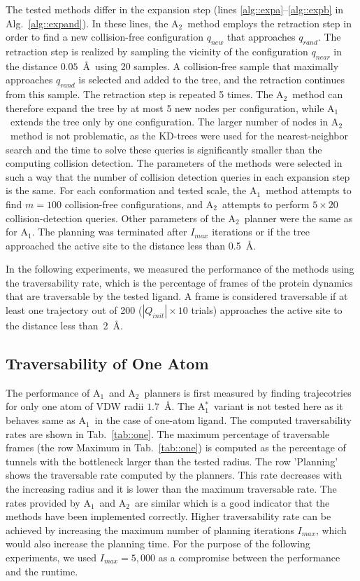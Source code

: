 \documentclass[usletter, 10pt, conference]{ieeeconf} %
\def\qrand{q_{rand}}
\def\qnear{q_{near}}
\def\qnew{q_{new}}
\def\QI{Q_{init}}
\def\Imax{I_{max}} %
\def\RA{A$_{1}$}
\def\RB{A$_{2}$}
\def\RC{A$_{1}^{*}$}
\begin{document}
{The tested methods differ in the expansion step (lines \ref{alg::expa}--\ref{alg::expb} in Alg.~\ref{alg::expand}).
In these lines, the \RB\ method employs the retraction step in order to find a new collision-free configuration $\qnew$ that approaches $\qrand$.
The retraction step is realized by sampling the vicinity of the configuration $\qnear$ in the distance $0.05$~\AA\ using 20 samples.
A collision-free sample that maximally approaches $\qrand$ is selected and added to the tree, and the retraction continues from this sample.
The retraction step is repeated 5 times.
The \RB\ method can therefore expand the tree by at most 5 new nodes per configuration, while \RA\ extends the tree only by one configuration.
The larger number of nodes in \RB\ method is not problematic, as the KD-trees were used for the nearest-neighbor search and the time to solve these queries is significantly smaller than the computing collision detection.
The parameters of the methods were selected in such a way that the number of collision detection queries in each expansion step is the same.
For each conformation and tested scale, the \RA\ method attempts to find $m=100$ collision-free configurations, and \RB\ attempts to perform $5 \times 20$ collision-detection queries.
Other parameters of the \RB\ planner were the same as for \RA.
The planning was terminated after $\Imax$ iterations or if the tree approached the active site to the distance less than 0.5~\AA.

In the following experiments, we measured the performance of the methods using the traversability rate, which is the percentage of frames of the protein dynamics that are traversable by the tested ligand.
A frame is considered traversable if at least one trajectory out of 200 ($\!|\QI|\!\times\!\!10$ trials) approaches the active site to the distance less than~2~\AA. 


\subsection{Traversability of One Atom}

The performance of \RA\ and \RB\ planners is first measured by finding trajecotries for only one atom of VDW radii $1.7$~\AA.
The \RC\ variant is not tested here as it behaves same as \RA\ in the case of one-atom ligand.
The computed traversability rates are shown in Tab.~\ref{tab::one}.
The maximum percentage of traversable frames (the row Maximum in Tab.~\ref{tab::one}) is computed as the percentage of tunnels with the bottleneck larger than the tested radius.
The row 'Planning' shows the traversable rate computed by the planners.
This rate decreases with the increasing radius and it is lower than the maximum traversable rate.
The rates provided by \RA\ and \RB\ are similar which is a good indicator that the methods have been implemented correctly.
Higher traversability rate can be achieved by increasing the maximum number of planning iterations $\Imax$, which would also
increase the planning time.
For the purpose of the following experiments, we used $\Imax=5,000$ as a compromise between the performance and the runtime.

}
\end{document}
